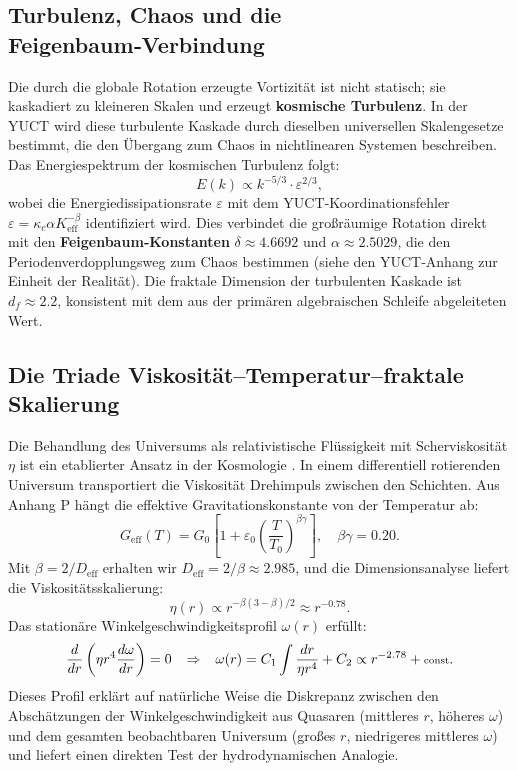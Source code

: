 \documentclass[11pt,a4paper]{article}
\begin{document}
	\subsection{Turbulenz, Chaos und die Feigenbaum‑Verbindung}
	
	Die durch die globale Rotation erzeugte Vortizität ist nicht statisch; sie kaskadiert zu kleineren Skalen und erzeugt \textbf{kosmische Turbulenz}. In der YUCT wird diese turbulente Kaskade durch dieselben universellen Skalengesetze bestimmt, die den Übergang zum Chaos in nichtlinearen Systemen beschreiben. Das Energiespektrum der kosmischen Turbulenz folgt:
	\begin{equation}
		E(k) \propto k^{-5/3} \cdot \varepsilon^{2/3},
	\end{equation}
	wobei die Energiedissipationsrate \(\varepsilon\) mit dem YUCT‑Koordinationsfehler \(\varepsilon = \kappa_c \alpha K_{\mathrm{eff}}^{-\beta}\) identifiziert wird. Dies verbindet die großräumige Rotation direkt mit den \textbf{Feigenbaum‑Konstanten} \(\delta \approx 4.6692\) und \(\alpha \approx 2.5029\), die den Periodenverdopplungsweg zum Chaos bestimmen (siehe den YUCT‑Anhang zur Einheit der Realität). Die fraktale Dimension der turbulenten Kaskade ist \(d_f \approx 2.2\), konsistent mit dem aus der primären algebraischen Schleife abgeleiteten Wert.
	
	\subsection{Die Triade Viskosität–Temperatur–fraktale Skalierung}
	
	Die Behandlung des Universums als relativistische Flüssigkeit mit Scherviskosität \(\eta\) ist ein etablierter Ansatz in der Kosmologie \cite{Giovannini2005}. In einem differentiell rotierenden Universum transportiert die Viskosität Drehimpuls zwischen den Schichten. Aus Anhang P hängt die effektive Gravitationskonstante von der Temperatur ab:
	\begin{equation}
		G_{\mathrm{eff}}(T) = G_0\left[1 + \varepsilon_0\left(\frac{T}{T_0}\right)^{\beta\gamma}\right], \quad \beta\gamma = 0.20.
	\end{equation}
	Mit \(\beta = 2/D_{\mathrm{eff}}\) erhalten wir \(D_{\mathrm{eff}} = 2/\beta \approx 2.985\), und die Dimensionsanalyse liefert die Viskositätsskalierung:
	\begin{equation}
		\eta(r) \propto r^{-\beta(3-\beta)/2} \approx r^{-0.78}.
	\end{equation}
	Das stationäre Winkelgeschwindigkeitsprofil \(\omega(r)\) erfüllt:
	\begin{equation}
		\scriptsize
		\frac{d}{dr}\left( \eta r^4 \frac{d\omega}{dr} \right) = 0 \quad \Rightarrow \quad \omega(r) = C_1 \int \frac{dr}{\eta r^4} + C_2 \propto r^{-2.78} + \text{const}.
	\end{equation}
	Dieses Profil erklärt auf natürliche Weise die Diskrepanz zwischen den Abschätzungen der Winkelgeschwindigkeit aus Quasaren (mittleres \(r\), höheres \(\omega\)) und dem gesamten beobachtbaren Universum (großes \(r\), niedrigeres mittleres \(\omega\)) und liefert einen direkten Test der hydrodynamischen Analogie.
	
\end{document}
